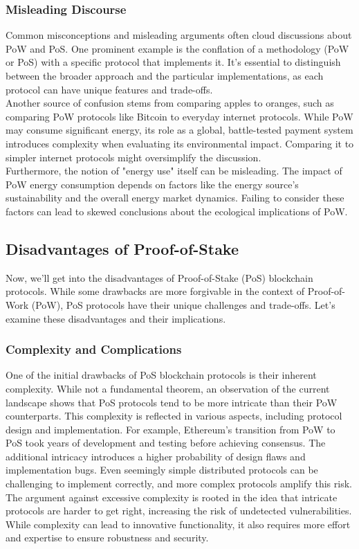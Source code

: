 \subsubsection{Misleading Discourse}
Common misconceptions and misleading arguments often cloud discussions about PoW and PoS. One prominent example is the conflation of a methodology (PoW or PoS) with a specific protocol that implements it. It's essential to distinguish between the broader approach and the particular implementations, as each protocol can have unique features and trade-offs.\\
Another source of confusion stems from comparing apples to oranges, such as comparing PoW protocols like Bitcoin to everyday internet protocols. While PoW may consume significant energy, its role as a global, battle-tested payment system introduces complexity when evaluating its environmental impact. Comparing it to simpler internet protocols might oversimplify the discussion.\\
Furthermore, the notion of "energy use" itself can be misleading. The impact of PoW energy consumption depends on factors like the energy source's sustainability and the overall energy market dynamics. Failing to consider these factors can lead to skewed conclusions about the ecological implications of PoW.

\subsection{Disadvantages of Proof-of-Stake}
Now, we'll get into the disadvantages of Proof-of-Stake (PoS) blockchain protocols. While some drawbacks are more forgivable in the context of Proof-of-Work (PoW), PoS protocols have their unique challenges and trade-offs. Let's examine these disadvantages and their implications.

\subsubsection{Complexity and Complications}
One of the initial drawbacks of PoS blockchain protocols is their inherent complexity. While not a fundamental theorem, an observation of the current landscape shows that PoS protocols tend to be more intricate than their PoW counterparts. This complexity is reflected in various aspects, including protocol design and implementation. For example, Ethereum's transition from PoW to PoS took years of development and testing before achieving consensus. The additional intricacy introduces a higher probability of design flaws and implementation bugs. Even seemingly simple distributed protocols can be challenging to implement correctly, and more complex protocols amplify this risk.\\
The argument against excessive complexity is rooted in the idea that intricate protocols are harder to get right, increasing the risk of undetected vulnerabilities. While complexity can lead to innovative functionality, it also requires more effort and expertise to ensure robustness and security.

